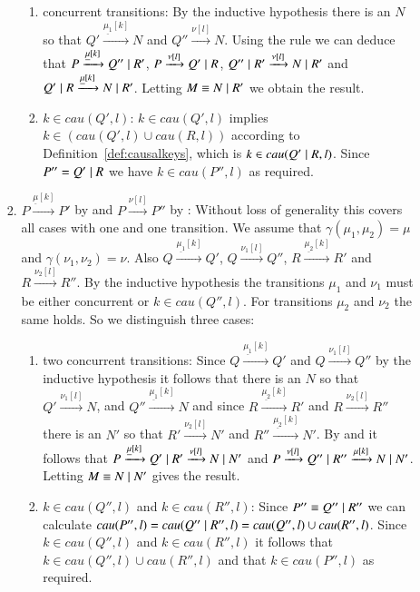 \begin{subappendices}
\begin{pf}
\begin{enumerate}
\begin{enumerate}
\begin{enumerate}
\begin{enumerate}
	\item concurrent transitions: By the inductive hypothesis there is an $N$ so that $Q' \xrightarrow{\underline{\mu_1}[k]} N$ and $Q'' \xrightarrow{\nu[l]} N$. Using the  rule we can deduce that $P \xrightarrow{\underline{\mu}[k]} Q'' \; \vert \; R'$,  $P \xrightarrow{\nu[l]} Q' \; \vert \; R$, $Q'' \; \vert \; R' \xrightarrow{\nu[l]} N \; \vert \; R'$ and $Q' \; \vert \; R \xrightarrow{\underline{\mu}[k]} N \; \vert \; R'$. Letting $M \equiv N \; \vert \; R'$ we obtain the result.
\item $k \in cau(Q',l)$: $k \in cau(Q',l)$ implies $k \in (cau(Q',l) \cup cau(R,l))$ according to Definition~\ref{def:causalkeys}, which is $k \in cau(Q' \; \vert \; R,l)$. Since $P'' = Q' \; \vert \; R$ we have $k \in cau(P'',l)$ as required.
\end{enumerate}
\item $P \xrightarrow{\underline{\mu}[k]} P'$ by  and $P \xrightarrow{\nu[l]} P''$ by 
: Without loss of generality this covers all cases with one  and one 
 transition. We assume that $\gamma(\mu_1,\mu_2)=\mu$ and $\gamma(\nu_1,\nu_2)=\nu$. Also $Q \xrightarrow{\underline{\mu_1}[k]} Q'$, $Q \xrightarrow{\nu_1[l]} Q''$, $R \xrightarrow{\underline{\mu_2}[k]} R'$ and $R \xrightarrow{\nu_2[l]} R''$. By the inductive hypothesis the transitions $\mu_1$ and $\nu_1$ must be either concurrent or $k \in cau(Q'',l)$. For transitions $\mu_2$ and $\nu_2$ the same holds. So we distinguish three cases:
\begin{enumerate}
	\item two concurrent transitions: Since $Q \xrightarrow{\underline{\mu_1}[k]} Q'$ and $Q \xrightarrow{\nu_1[l]} Q''$ by the inductive hypothesis it follows that there is an $N$ so that $Q' \xrightarrow{\nu_1[l]} N$, and $Q'' \xrightarrow{\underline{\mu_1}[k]} N$ and since $R \xrightarrow{\underline{\mu_2}[k]} R'$ and $R \xrightarrow{\nu_2[l]} R''$ there is an $N'$ so that $R' \xrightarrow{\nu_2[l]} N'$ and $R'' \xrightarrow{\underline{\mu_2}[k]} N'$. By  and  it follows that $P \xrightarrow{\underline{\mu}[k]} Q' \; \vert \; R' \xrightarrow{\nu[l]} N \; \vert \; N'$ and $P \xrightarrow{\nu[l]} Q'' \; \vert \; R'' \xrightarrow{\mu[k]} N \; \vert \; N'$. Letting $M \equiv N \; \vert \; N'$ gives the result.

\item $k \in cau(Q'',l)$ and $k \in cau(R'',l)$: Since $P''\equiv Q'' \; \vert \; R''$ we can calculate $cau(P'',l)=cau(Q'' \; \vert \; R'',l)=cau(Q'',l) \cup cau(R'',l)$. Since $k \in cau(Q'',l)$ and $k \in cau(R'',l)$ it follows that $k \in cau(Q'',l) \cup cau(R'',l)$ and  that $k \in cau(P'',l)$ as required.


\end{enumerate}
\end{enumerate}
\end{enumerate}
\end{enumerate}
\end{pf}
\end{subappendices}
